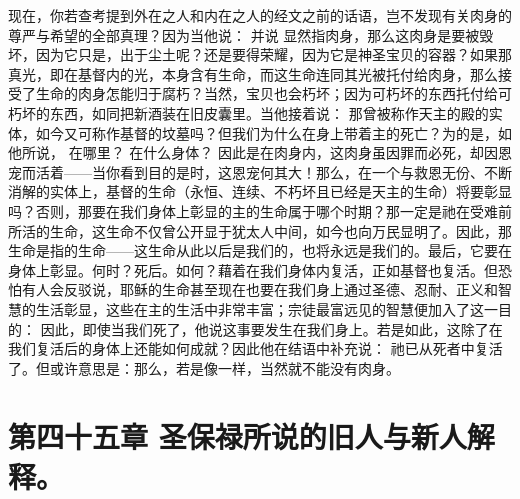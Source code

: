 现在，你若查考提到外在之人和内在之人的经文之前的话语，岂不发现有关肉身的尊严与希望的全部真理？因为当他说： 并说 显然指肉身，那么这肉身是要被毁坏，因为它只是，出于尘土呢？还是要得荣耀，因为它是神圣宝贝的容器？如果那真光，即在基督内的光，本身含有生命，而这生命连同其光被托付给肉身，那么接受了生命的肉身怎能归于腐朽？当然，宝贝也会朽坏；因为可朽坏的东西托付给可朽坏的东西，如同把新酒装在旧皮囊里。当他接着说： 那曾被称作天主的殿的实体，如今又可称作基督的坟墓吗？但我们为什么在身上带着主的死亡？为的是，如他所说， 在哪里？ 在什么身体？ 因此是在肉身内，这肉身虽因罪而必死，却因恩宠而活着——当你看到目的是时，这恩宠何其大！那么，在一个与救恩无份、不断消解的实体上，基督的生命（永恒、连续、不朽坏且已经是天主的生命）将要彰显吗？否则，那要在我们身体上彰显的主的生命属于哪个时期？那一定是祂在受难前所活的生命，这生命不仅曾公开显于犹太人中间，如今也向万民显明了。因此，那生命是指的生命——这生命从此以后是我们的，也将永远是我们的。最后，它要在身体上彰显。何时？死后。如何？藉着在我们身体内复活，正如基督也复活。但恐怕有人会反驳说，耶稣的生命甚至现在也要在我们身上通过圣德、忍耐、正义和智慧的生活彰显，这些在主的生活中非常丰富；宗徒最富远见的智慧便加入了这一目的： 因此，即使当我们死了，他说这事要发生在我们身上。若是如此，这除了在我们复活后的身体上还能如何成就？因此他在结语中补充说： 祂已从死者中复活了。但或许意思是：那么，若是像一样，当然就不能没有肉身。\par


\section{第四十五章 圣保禄所说的旧人与新人解释。}

